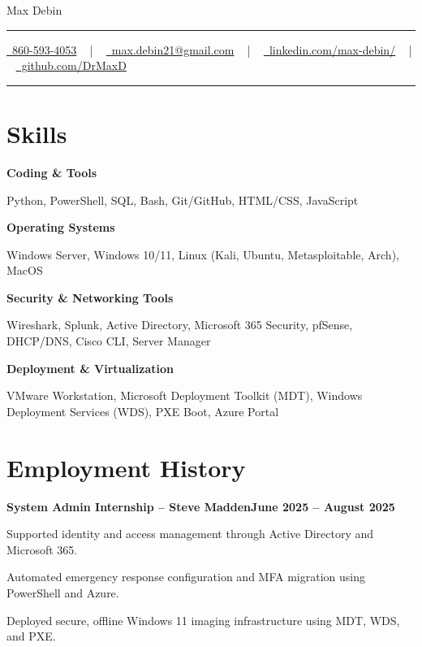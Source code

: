 \documentclass[letterpaper,10pt]{article}
\newcommand{\documentTitle}[2]{
  \begin{center}
    {\Huge\color{accentTitle} #1}
    \vspace{10pt}
    
    {\color{accentLine} \hrule}
    \vspace{2pt}
    
    \footnotesize{#2}
    \vspace{2pt}
    
    {\color{accentLine} \hrule}
  \end{center}
}
\newcommand{\heading}[2]{
  \hspace{10pt}#1\hfill#2\\
}
\newcommand{\headingBf}[2]{
  \heading{\textbf{#1}}{\textbf{#2}}
}
\newenvironment{resume_list}{
  \vspace{-7pt}
  \begin{itemize}[itemsep=-2px, parsep=1pt, leftmargin=30pt]
}{
  \end{itemize}
}
\begin{document}
\documentTitle{Max Debin}{
  \href{tel:8605934053}{\raisebox{-0.05\height} \faPhone\ 860-593-4053} ~ | ~
  \href{mailto:max.debin21@gmail.com}{\raisebox{-0.15\height} \faEnvelope\ max.debin21@gmail.com} ~ | ~
  \href{https://www.linkedin.com/in/max-debin/}{\raisebox{-0.15\height} \faLinkedin\ linkedin.com/max-debin/} ~ | ~
  \href{https://github.com/DrMaxD}{\raisebox{-0.15\height} \faGithub\ github.com/DrMaxD}
}

\section{Skills}

\headingBf{Coding \& Tools}{}
\begin{resume_list}
  \item Python, PowerShell, SQL, Bash, Git/GitHub, HTML/CSS, JavaScript
\end{resume_list}

\headingBf{Operating Systems}{}
\begin{resume_list}
  \item Windows Server, Windows 10/11, Linux (Kali, Ubuntu, Metasploitable, Arch), MacOS
\end{resume_list}

\headingBf{Security \& Networking Tools}{}
\begin{resume_list}
  \item Wireshark, Splunk, Active Directory, Microsoft 365 Security, pfSense, DHCP/DNS, Cisco CLI, Server Manager
\end{resume_list}

\headingBf{Deployment \& Virtualization}{}
\begin{resume_list}
  \item VMware Workstation, Microsoft Deployment Toolkit (MDT), Windows Deployment Services (WDS), PXE Boot, Azure Portal
\end{resume_list}

\section{Employment History}

\headingBf{System Admin Internship -- Steve Madden}{June 2025 -- August 2025}
\begin{resume_list}
  \item Supported identity and access management through Active Directory and Microsoft 365.
  \item Automated emergency response configuration and MFA migration using PowerShell and Azure.
  \item Deployed secure, offline Windows 11 imaging infrastructure using MDT, WDS, and PXE.
\end{resume_list}
\end{document}
